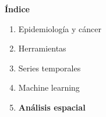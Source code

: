 \documentclass{beamer}
\begin{document}
\begin{frame}\frametitle{}
	
	\Large{\textbf{Índice}}\\[2ex]
	\normalsize
	\begin{enumerate}
		\item Epidemiología y cáncer\\[2ex]
		\item Herramientas\\[2ex]
		\item Series temporales \\[2ex]
		\item Machine learning \\[2ex]
		\item \textbf{Análisis espacial} \\[2ex]
	\end{enumerate}
	
\end{frame}
\end{document}
